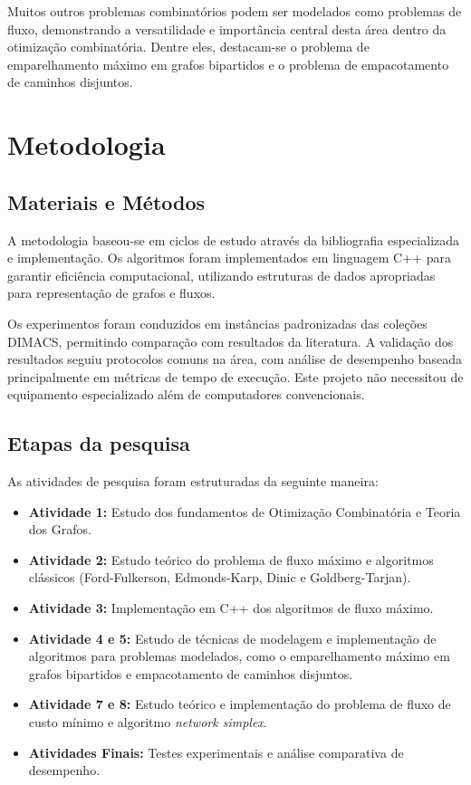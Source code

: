 \documentclass[12pt,a4paper]{article}
\begin{document}
Muitos outros problemas combinatórios podem ser modelados como problemas de fluxo, demonstrando a versatilidade e importância central desta área dentro da otimização combinatória. Dentre eles, destacam-se o problema de emparelhamento máximo em grafos bipartidos e o problema de empacotamento de caminhos disjuntos.

\section{Metodologia}

\subsection{Materiais e Métodos}
A metodologia baseou-se em ciclos de estudo através da bibliografia especializada e implementação. Os algoritmos foram implementados em linguagem C++ para garantir eficiência computacional, utilizando estruturas de dados apropriadas para representação de grafos e fluxos. 

Os experimentos foram conduzidos em instâncias padronizadas das coleções DIMACS, permitindo comparação com resultados da literatura. A validação dos resultados seguiu protocolos comuns na área, com análise de desempenho baseada principalmente em métricas de tempo de execução. Este projeto não necessitou de equipamento especializado além de computadores convencionais.

\subsection{Etapas da pesquisa}
As atividades de pesquisa foram estruturadas da seguinte maneira:
\begin{itemize}
    \item \textbf{Atividade 1:} Estudo dos fundamentos de Otimização Combinatória e Teoria dos Grafos.
    \item \textbf{Atividade 2:} Estudo teórico do problema de fluxo máximo e algoritmos clássicos (Ford-Fulkerson, Edmonds-Karp, Dinic e Goldberg-Tarjan).
    \item \textbf{Atividade 3:} Implementação em C++ dos algoritmos de fluxo máximo.
    \item \textbf{Atividade 4 e 5:} Estudo de técnicas de modelagem e implementação de algoritmos para problemas modelados, como o emparelhamento máximo em grafos bipartidos e empacotamento de caminhos disjuntos.
    \item \textbf{Atividade 7 e 8:} Estudo teórico e implementação do problema de fluxo de custo mínimo e algoritmo \textit{network simplex}.
    \item \textbf{Atividades Finais:} Testes experimentais e análise comparativa de desempenho.
\end{itemize}
\end{document}
